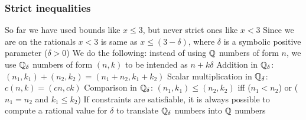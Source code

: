 \begin{frame}
  \frametitle{Strict inequalities}

  So far we have used bounds like $x \leq 3$, but never strict ones like $x < 3$
  \vfill\pause
  Since we are on the rationals $x < 3$ is same as $x \leq (3 - \delta)$,
  where $\delta$ is a symbolic positive parameter ($\delta > 0$) 
  \vfill\pause
  We do the following: instead of using $\mathbb{Q}$ numbers of form $n$, we use $\mathbb{Q}_\delta$ numbers of form $(n, k)$
  to be intended as $n + k\delta$
  \vfill\pause
  Addition in $\mathbb{Q}_\delta$: $(n_1, k_1) + (n_2, k_2) = (n_1+n_2, k_1+k_2)$
  \vfill\pause
  Scalar multiplication in $\mathbb{Q}_\delta$: $c(n, k) = (cn, ck)$
  \vfill\pause
  Comparison in $\mathbb{Q}_\delta$: $(n_1, k_1) \leq (n_2, k_2)$ iff  ($n_1 < n_2$) or ($n_1 = n_2$ and $k_1 \leq k_2$)
  \vfill\pause
  If constraints are satisfiable, it is always possible to compute a rational 
  value for $\delta$ to translate $\mathbb{Q}_\delta$ numbers into $\mathbb{Q}$ numbers

\end{frame}

